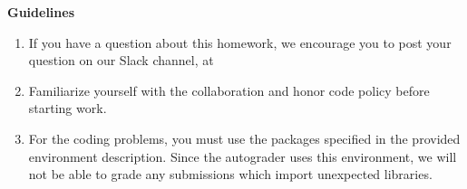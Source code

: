 {\bf Guidelines}
\begin{enumerate}[itemsep=2pt]
    \item If you have a question about this homework, we encourage you to post your question on our Slack channel, at \slack
    \item Familiarize yourself with the collaboration and honor code policy before starting work.
    \item For the coding problems, you must use the packages specified in the provided environment description.  Since the autograder uses this environment, we will not be able to grade any submissions which import unexpected libraries.
\end{enumerate}
